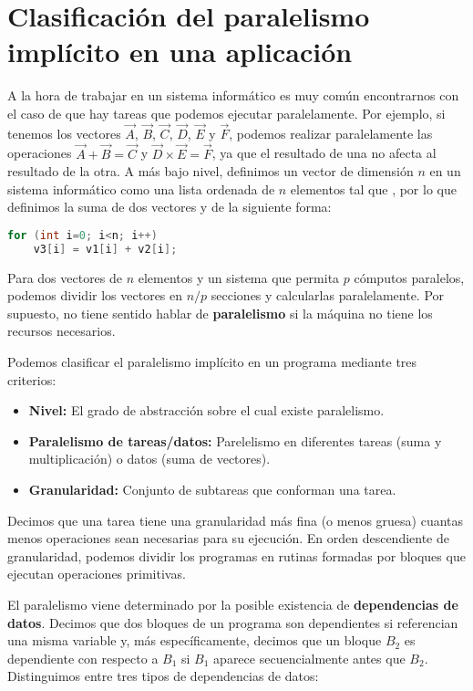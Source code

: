\section{Clasificación del paralelismo implícito en una aplicación}

A la hora de trabajar en un sistema informático es muy común encontrarnos con el caso de que hay tareas que podemos ejecutar paralelamente.
Por ejemplo, si tenemos los vectores $\vec{A}$, $\vec{B}$, $\vec{C}$, $\vec{D}$, $\vec{E}$ y $\vec{F}$, podemos realizar paralelamente las operaciones $\vec{A}+\vec{B}=\vec{C}$ y $\vec{D}\times\vec{E}=\vec{F}$, ya que el resultado de una no afecta al resultado de la otra.
A más bajo nivel, definimos un vector de dimensión $n$ en un sistema informático como una lista ordenada de $n$ elementos tal que , por lo que definimos la suma de dos vectores  y  de la siguiente forma:

\begin{lstlisting}[language=C]
for (int i=0; i<n; i++)
	v3[i] = v1[i] + v2[i];
\end{lstlisting}

Para dos vectores de $n$ elementos y un sistema que permita $p$ cómputos paralelos, podemos dividir los vectores en $n/p$ secciones y calcularlas paralelamente.
Por supuesto, no tiene sentido hablar de \textbf{paralelismo} si la máquina no tiene los recursos necesarios.

Podemos clasificar el paralelismo implícito en un programa mediante tres criterios:

\begin{itemize}
	\item\textbf{Nivel:} El grado de abstracción sobre el cual existe paralelismo.
	\item\textbf{Paralelismo de tareas/datos:} Parelelismo en diferentes tareas (suma y multiplicación) o datos (suma de vectores).
	\item\textbf{Granularidad:} Conjunto de subtareas que conforman una tarea.
\end{itemize}

Decimos que una tarea tiene una granularidad más fina (o menos gruesa) cuantas menos operaciones sean necesarias para su ejecución.
En orden descendiente de granularidad, podemos dividir los programas en rutinas formadas por bloques que ejecutan operaciones primitivas.

El paralelismo viene determinado por la posible existencia de \textbf{dependencias de datos}.
Decimos que dos bloques de un programa son dependientes si referencian una misma variable y, más específicamente, decimos que un bloque $B_2$ es dependiente con respecto a $B_1$ si $B_1$ aparece secuencialmente antes que $B_2$.
Distinguimos entre tres tipos de dependencias de datos:

